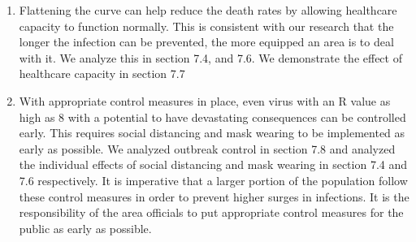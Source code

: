\documentclass[11pt]{article}
\begin{document}
\begin{enumerate}
    \item Flattening the curve can help reduce the death rates by allowing healthcare capacity to function normally. This is consistent with our research \cite{flatten_curve} that the longer the infection can be prevented, the more equipped an area is to deal with it. We analyze this in section 7.4, and 7.6. We demonstrate the effect of healthcare capacity in section 7.7
    \item With appropriate control measures in place, even virus with an R value as high as 8 with a potential to have devastating consequences can be controlled early. This requires social distancing and mask wearing to be implemented as early as possible. We analyzed outbreak control in section 7.8 and analyzed the individual effects of social distancing and mask wearing in section 7.4 and 7.6 respectively. It is imperative that a larger portion of the population follow these control measures in order to prevent higher surges in infections. It is the responsibility of the area officials to put appropriate control measures for the public as early as possible.

    
\end{enumerate}

\pagebreak
\listoffigures
\listoftables


\end{document}
